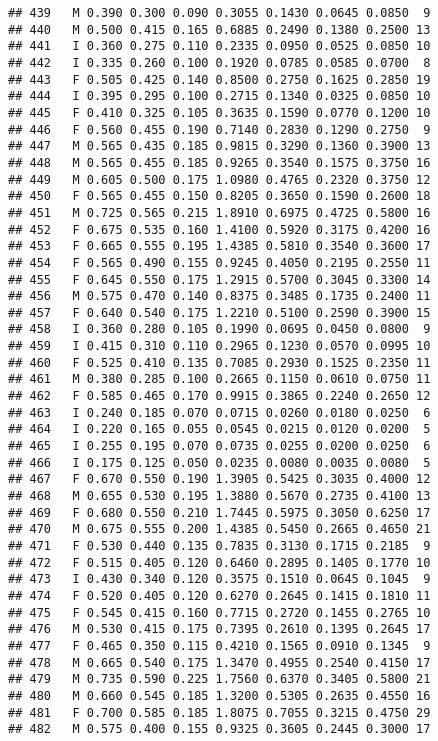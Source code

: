\documentclass[
]{article}
\begin{document}
\begin{verbatim}
## 439   M 0.390 0.300 0.090 0.3055 0.1430 0.0645 0.0850  9
## 440   M 0.500 0.415 0.165 0.6885 0.2490 0.1380 0.2500 13
## 441   I 0.360 0.275 0.110 0.2335 0.0950 0.0525 0.0850 10
## 442   I 0.335 0.260 0.100 0.1920 0.0785 0.0585 0.0700  8
## 443   F 0.505 0.425 0.140 0.8500 0.2750 0.1625 0.2850 19
## 444   I 0.395 0.295 0.100 0.2715 0.1340 0.0325 0.0850 10
## 445   F 0.410 0.325 0.105 0.3635 0.1590 0.0770 0.1200 10
## 446   F 0.560 0.455 0.190 0.7140 0.2830 0.1290 0.2750  9
## 447   M 0.565 0.435 0.185 0.9815 0.3290 0.1360 0.3900 13
## 448   M 0.565 0.455 0.185 0.9265 0.3540 0.1575 0.3750 16
## 449   M 0.605 0.500 0.175 1.0980 0.4765 0.2320 0.3750 12
## 450   F 0.565 0.455 0.150 0.8205 0.3650 0.1590 0.2600 18
## 451   M 0.725 0.565 0.215 1.8910 0.6975 0.4725 0.5800 16
## 452   F 0.675 0.535 0.160 1.4100 0.5920 0.3175 0.4200 16
## 453   F 0.665 0.555 0.195 1.4385 0.5810 0.3540 0.3600 17
## 454   F 0.565 0.490 0.155 0.9245 0.4050 0.2195 0.2550 11
## 455   F 0.645 0.550 0.175 1.2915 0.5700 0.3045 0.3300 14
## 456   M 0.575 0.470 0.140 0.8375 0.3485 0.1735 0.2400 11
## 457   F 0.640 0.540 0.175 1.2210 0.5100 0.2590 0.3900 15
## 458   I 0.360 0.280 0.105 0.1990 0.0695 0.0450 0.0800  9
## 459   I 0.415 0.310 0.110 0.2965 0.1230 0.0570 0.0995 10
## 460   F 0.525 0.410 0.135 0.7085 0.2930 0.1525 0.2350 11
## 461   M 0.380 0.285 0.100 0.2665 0.1150 0.0610 0.0750 11
## 462   F 0.585 0.465 0.170 0.9915 0.3865 0.2240 0.2650 12
## 463   I 0.240 0.185 0.070 0.0715 0.0260 0.0180 0.0250  6
## 464   I 0.220 0.165 0.055 0.0545 0.0215 0.0120 0.0200  5
## 465   I 0.255 0.195 0.070 0.0735 0.0255 0.0200 0.0250  6
## 466   I 0.175 0.125 0.050 0.0235 0.0080 0.0035 0.0080  5
## 467   F 0.670 0.550 0.190 1.3905 0.5425 0.3035 0.4000 12
## 468   M 0.655 0.530 0.195 1.3880 0.5670 0.2735 0.4100 13
## 469   F 0.680 0.550 0.210 1.7445 0.5975 0.3050 0.6250 17
## 470   M 0.675 0.555 0.200 1.4385 0.5450 0.2665 0.4650 21
## 471   F 0.530 0.440 0.135 0.7835 0.3130 0.1715 0.2185  9
## 472   F 0.515 0.405 0.120 0.6460 0.2895 0.1405 0.1770 10
## 473   I 0.430 0.340 0.120 0.3575 0.1510 0.0645 0.1045  9
## 474   F 0.520 0.405 0.120 0.6270 0.2645 0.1415 0.1810 11
## 475   F 0.545 0.415 0.160 0.7715 0.2720 0.1455 0.2765 10
## 476   M 0.530 0.415 0.175 0.7395 0.2610 0.1395 0.2645 17
## 477   F 0.465 0.350 0.115 0.4210 0.1565 0.0910 0.1345  9
## 478   M 0.665 0.540 0.175 1.3470 0.4955 0.2540 0.4150 17
## 479   M 0.735 0.590 0.225 1.7560 0.6370 0.3405 0.5800 21
## 480   M 0.660 0.545 0.185 1.3200 0.5305 0.2635 0.4550 16
## 481   F 0.700 0.585 0.185 1.8075 0.7055 0.3215 0.4750 29
## 482   M 0.575 0.400 0.155 0.9325 0.3605 0.2445 0.3000 17

\end{verbatim}
\end{document}
